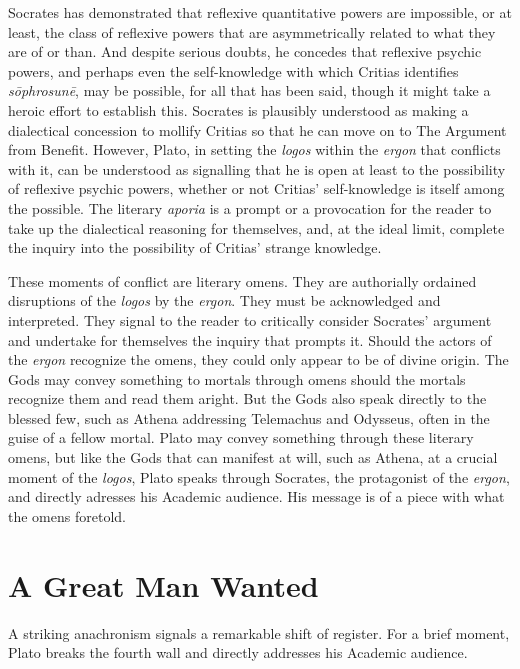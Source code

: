 Socrates has demonstrated that reflexive quantitative powers are impossible, or at least, the class of reflexive powers that are asymmetrically related to what they are of or than. And despite serious doubts, he concedes that reflexive psychic powers, and perhaps even the self-knowledge with which Critias identifies \emph{sōphrosunē}, may be possible, for all that has been said, though it might take a heroic effort to establish this. Socrates is plausibly understood as making a dialectical concession to mollify Critias so that he can move on to The Argument from Benefit. However, Plato, in setting the \emph{logos} within the \emph{ergon} that conflicts with it, can be understood as signalling that he is open at least to the possibility of reflexive psychic powers, whether or not Critias' self-knowledge is itself among the possible. The literary \emph{aporia} is a prompt or a provocation for the reader to take up the dialectical reasoning for themselves, and, at the ideal limit, complete the inquiry into the possibility of Critias' strange knowledge. 

These moments of conflict are literary omens. They are authorially ordained disruptions of the \emph{logos} by the \emph{ergon}. They must be acknowledged and interpreted. They signal to the reader to critically consider Socrates' argument and undertake for themselves the inquiry that prompts it. Should the actors of the \emph{ergon} recognize the omens, they could only appear to be of divine origin. The Gods may convey something to mortals through omens should the mortals recognize them and read them aright. But the Gods also speak directly to the blessed few, such as Athena addressing Telemachus and Odysseus, often in the guise of a fellow mortal. Plato may convey something through these literary omens, but like the Gods that can manifest at will, such as Athena, at a crucial moment of the \emph{logos}, Plato speaks through Socrates, the protagonist of the \emph{ergon}, and directly adresses his Academic audience. His message is of a piece with what the omens foretold.


\section{A Great Man Wanted} %
\label{sec:a_great_man_wanted}

A striking anachronism signals a remarkable shift of register. For a brief moment, Plato breaks the fourth wall and directly addresses his Academic audience.

